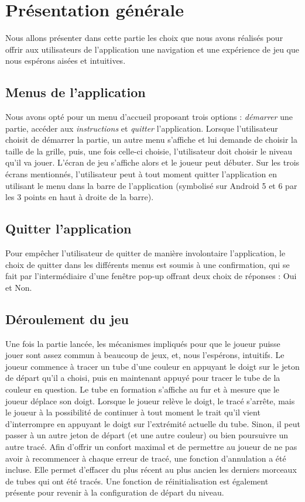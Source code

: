\documentclass[12pt, a4paper]{article}%
\begin{document}
\section{Présentation générale}
	Nous allons présenter dans cette partie les choix que nous avons réalisés pour offrir aux utilisateurs de l'application une navigation et une expérience de jeu que nous espérons aisées et intuitives.
	
	\subsection{Menus de l'application}
	Nous avons opté pour un menu d'accueil proposant trois options : \textit{démarrer} une partie, accéder aux \textit{instructions} et \textit{quitter} l'application.
	Lorsque l'utilisateur choisit de démarrer la partie, un autre menu s'affiche et lui demande de choisir la taille de la grille, puis, une fois celle-ci choisie, l'utilisateur doit choisir le niveau qu'il va jouer. L'écran de jeu s'affiche alors et le joueur peut débuter. Sur les trois écrans mentionnés, l'utilisateur peut à tout moment quitter l'application en utilisant le menu dans la barre de l'application  (symbolisé sur Android 5 et 6 par les 3 points en haut à droite de la barre).
	
	\subsection{Quitter l'application}
	Pour empêcher l'utilisateur de quitter de manière involontaire l'application, le choix de quitter dans les différents menus est soumis à une confirmation, qui se fait par l'intermédiaire d'une fenêtre pop-up offrant deux choix de réponses : Oui et Non.
	
	\subsection{Déroulement du jeu}
	Une fois la partie lancée, les mécanismes impliqués pour que le joueur puisse jouer sont assez commun à beaucoup de jeux, et, nous l'espérons, intuitifs. Le joueur commence à tracer un tube d'une couleur en appuyant le doigt sur le jeton de départ qu'il a choisi, puis en maintenant appuyé pour tracer le tube de la couleur en question. Le tube en formation s'affiche au fur et à mesure que le joueur déplace son doigt. Lorsque le joueur relève le doigt, le tracé s'arrête, mais le joueur à la possibilité de continuer à tout moment le trait qu'il vient d'interrompre en appuyant le doigt sur l'extrémité actuelle du tube. Sinon, il peut passer à un autre jeton de départ (et une autre couleur) ou bien poursuivre un autre tracé.
	\newline
	Afin d'offrir un confort maximal et de permettre au joueur de ne pas avoir à recommencer à chaque erreur de tracé, une fonction d'annulation a été incluse. Elle permet d'effacer du plus récent au plus ancien les derniers morceaux de tubes qui ont été tracés. Une fonction de réinitialisation est également présente pour revenir à la configuration de départ du niveau.
	
\end{document}
